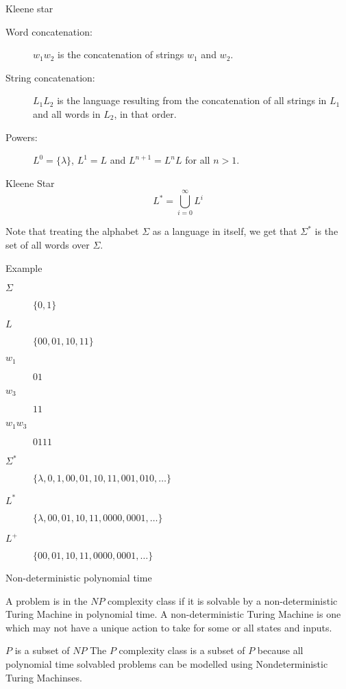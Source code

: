 \begin{frame}{Kleene star}
  \begin{description}
    \item[Word concatenation:] $w_1 w_2$ is the concatenation of strings $w_1$ and $w_2$.
    \item[String concatenation:] $L_1 L_2$ is the language resulting from the concatenation of all strings in $L_1$ and all words in $L_2$, in that order.
    \item[Powers:] $L^0 = \{ \lambda \}$, $L^1 = L$ and $L^{n+1} = L^n L$ for all $n > 1$.
  \end{description}
  
  \vspace{0.5cm}
  
  \begin{block}{Kleene Star}
     \[ L^* =  \bigcup_{i=0}^{\infty} L^i \]
  \end{block}
  
  Note that treating the alphabet $\Sigma$ as a language in itself, we get that $\Sigma^*$ is the set of all words over $\Sigma$.
\end{frame}


\begin{frame}{Example}
  \begin{description}
    \item[$\Sigma$] $\{ 0, 1 \}$
    \item[$L$] $\{ 00, 01, 10, 11 \}$
    \item[$w_1$] $01$
    \item[$w_3$] $11$
    \item[$w_1 w_3$] $0111$
    \item[$\Sigma^*$] $\{ \lambda, 0, 1, 00, 01, 10, 11, 001, 010, \ldots \}$
    \item[$L^*$] $\{ \lambda, 00, 01, 10, 11, 0000, 0001, \ldots \}$
    \item[$L^+$] $\{ 00, 01, 10, 11, 0000, 0001, \ldots \}$
  \end{description}
\end{frame}










\begin{frame}{Non-deterministic polynomial time}
  \begin{definition}
  A problem is in the $NP$ complexity class if it is solvable by a non-deterministic Turing Machine in polynomial time. A non-deterministic Turing Machine is one which may not have a unique action to take for some or all states and inputs.
  \end{definition}
  
  \vspace{0.5cm}
  \begin{block}{$P$ is a subset of $NP$}
  The $P$ complexity class is a subset of $P$ because all polynomial time solvabled problems can be modelled using Nondeterministic Turing Machinses.
  \end{block}

\end{frame}


